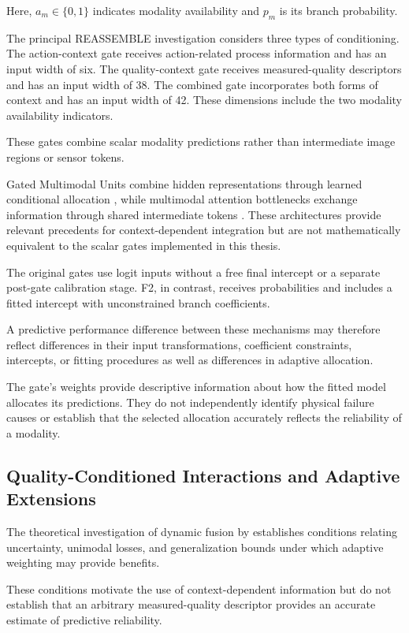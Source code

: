 Here, \(a_m\in\{0,1\}\) indicates modality availability and \(p_m\) is its branch probability.

The principal REASSEMBLE investigation considers three types of conditioning. The action-context gate receives action-related process information and has an input width of six. The quality-context gate receives measured-quality descriptors and has an input width of 38. The combined gate incorporates both forms of context and has an input width of 42. These dimensions include the two modality availability indicators.

These gates combine scalar modality predictions rather than intermediate image regions or sensor tokens.

Gated Multimodal Units combine hidden representations through learned conditional allocation \parencite{P006}, while multimodal attention bottlenecks exchange information through shared intermediate tokens \parencite{Nagrani2021MBT}. These architectures provide relevant precedents for context-dependent integration but are not mathematically equivalent to the scalar gates implemented in this thesis.

The original gates use logit inputs without a free final intercept or a separate post-gate calibration stage. F2, in contrast, receives probabilities and includes a fitted intercept with unconstrained branch coefficients.

A predictive performance difference between these mechanisms may therefore reflect differences in their input transformations, coefficient constraints, intercepts, or fitting procedures as well as differences in adaptive allocation.

The gate’s weights provide descriptive information about how the fitted model allocates its predictions. They do not independently identify physical failure causes or establish that the selected allocation accurately reflects the reliability of a modality.

\subsection{Quality-Conditioned Interactions and Adaptive Extensions}

The theoretical investigation of dynamic fusion by \textcite{Zhang2023QMF} establishes conditions relating uncertainty, unimodal losses, and generalization bounds under which adaptive weighting may provide benefits.

These conditions motivate the use of context-dependent information but do not establish that an arbitrary measured-quality descriptor provides an accurate estimate of predictive reliability.

